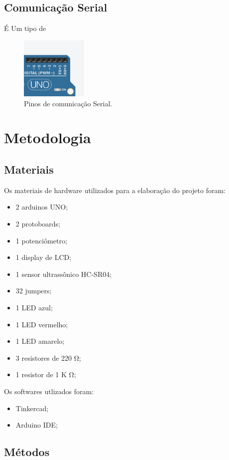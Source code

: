 \documentclass[conference]{IEEEtran}
\begin{document}
\subsection{Comunicação Serial}
É Um tipo de

\begin{figure}[htbp]
    \centerline{
        \includegraphics[width=3.2cm]{images/pinos-TxRx.png}
    }
    \caption{Pinos de comunicação Serial.}
    \label{fig}
\end{figure}

\section{Metodologia}

\subsection{Materiais}
Os materiais de hardware utilizados para a elaboração do projeto foram:
\begin{itemize}
    \item 2 arduinos UNO;
    \item 2 protoboards;
    \item 1 potenciômetro;
    \item 1 display de LCD;
    \item 1 sensor ultrassônico HC-SR04;
    \item 32 jumpers;
    \item 1 LED azul;
    \item 1 LED vermelho;
    \item 1 LED amarelo;
    \item 3 resistores de 220 \si{\ohm};
    \item 1 resistor de 1 K \si{\ohm};
\end{itemize}
Os softwares utlizados foram:
\begin{itemize}
    \item Tinkercad;
    \item Arduino IDE;
\end{itemize}

\subsection{Métodos}
\end{document}
